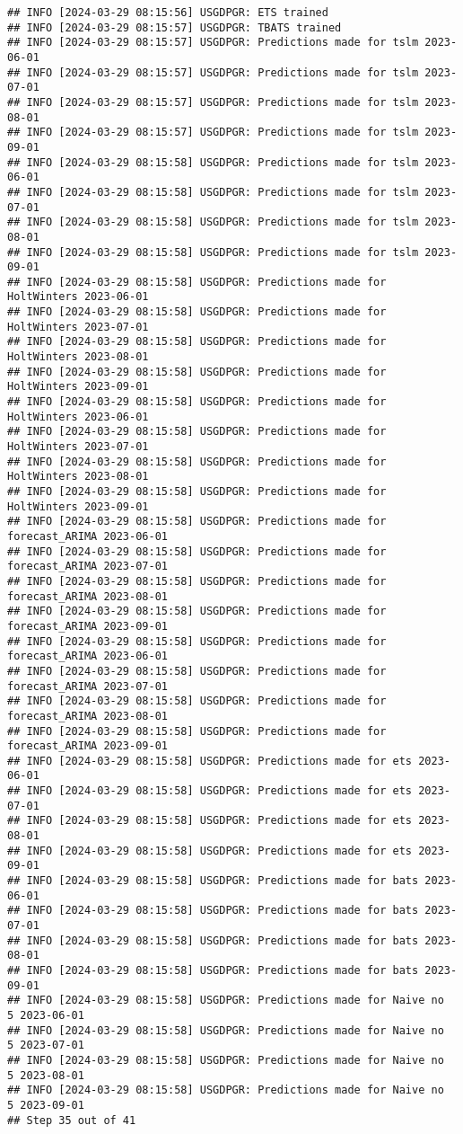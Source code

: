 \documentclass[
]{article}
\begin{document}
\begin{verbatim}
## INFO [2024-03-29 08:15:56] USGDPGR: ETS trained
## INFO [2024-03-29 08:15:57] USGDPGR: TBATS trained
## INFO [2024-03-29 08:15:57] USGDPGR: Predictions made for tslm 2023-06-01
## INFO [2024-03-29 08:15:57] USGDPGR: Predictions made for tslm 2023-07-01
## INFO [2024-03-29 08:15:57] USGDPGR: Predictions made for tslm 2023-08-01
## INFO [2024-03-29 08:15:57] USGDPGR: Predictions made for tslm 2023-09-01
## INFO [2024-03-29 08:15:58] USGDPGR: Predictions made for tslm 2023-06-01
## INFO [2024-03-29 08:15:58] USGDPGR: Predictions made for tslm 2023-07-01
## INFO [2024-03-29 08:15:58] USGDPGR: Predictions made for tslm 2023-08-01
## INFO [2024-03-29 08:15:58] USGDPGR: Predictions made for tslm 2023-09-01
## INFO [2024-03-29 08:15:58] USGDPGR: Predictions made for HoltWinters 2023-06-01
## INFO [2024-03-29 08:15:58] USGDPGR: Predictions made for HoltWinters 2023-07-01
## INFO [2024-03-29 08:15:58] USGDPGR: Predictions made for HoltWinters 2023-08-01
## INFO [2024-03-29 08:15:58] USGDPGR: Predictions made for HoltWinters 2023-09-01
## INFO [2024-03-29 08:15:58] USGDPGR: Predictions made for HoltWinters 2023-06-01
## INFO [2024-03-29 08:15:58] USGDPGR: Predictions made for HoltWinters 2023-07-01
## INFO [2024-03-29 08:15:58] USGDPGR: Predictions made for HoltWinters 2023-08-01
## INFO [2024-03-29 08:15:58] USGDPGR: Predictions made for HoltWinters 2023-09-01
## INFO [2024-03-29 08:15:58] USGDPGR: Predictions made for forecast_ARIMA 2023-06-01
## INFO [2024-03-29 08:15:58] USGDPGR: Predictions made for forecast_ARIMA 2023-07-01
## INFO [2024-03-29 08:15:58] USGDPGR: Predictions made for forecast_ARIMA 2023-08-01
## INFO [2024-03-29 08:15:58] USGDPGR: Predictions made for forecast_ARIMA 2023-09-01
## INFO [2024-03-29 08:15:58] USGDPGR: Predictions made for forecast_ARIMA 2023-06-01
## INFO [2024-03-29 08:15:58] USGDPGR: Predictions made for forecast_ARIMA 2023-07-01
## INFO [2024-03-29 08:15:58] USGDPGR: Predictions made for forecast_ARIMA 2023-08-01
## INFO [2024-03-29 08:15:58] USGDPGR: Predictions made for forecast_ARIMA 2023-09-01
## INFO [2024-03-29 08:15:58] USGDPGR: Predictions made for ets 2023-06-01
## INFO [2024-03-29 08:15:58] USGDPGR: Predictions made for ets 2023-07-01
## INFO [2024-03-29 08:15:58] USGDPGR: Predictions made for ets 2023-08-01
## INFO [2024-03-29 08:15:58] USGDPGR: Predictions made for ets 2023-09-01
## INFO [2024-03-29 08:15:58] USGDPGR: Predictions made for bats 2023-06-01
## INFO [2024-03-29 08:15:58] USGDPGR: Predictions made for bats 2023-07-01
## INFO [2024-03-29 08:15:58] USGDPGR: Predictions made for bats 2023-08-01
## INFO [2024-03-29 08:15:58] USGDPGR: Predictions made for bats 2023-09-01
## INFO [2024-03-29 08:15:58] USGDPGR: Predictions made for Naive no  5 2023-06-01
## INFO [2024-03-29 08:15:58] USGDPGR: Predictions made for Naive no  5 2023-07-01
## INFO [2024-03-29 08:15:58] USGDPGR: Predictions made for Naive no  5 2023-08-01
## INFO [2024-03-29 08:15:58] USGDPGR: Predictions made for Naive no  5 2023-09-01
## Step 35 out of 41
\end{verbatim}
\end{document}
